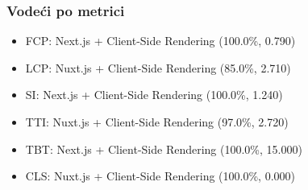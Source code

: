 \subsubsection{Vodeći po metrici}
\begin{itemize}
    \item FCP: Next.js + Client-Side Rendering (100.0\%, 0.790)
    \item LCP: Nuxt.js + Client-Side Rendering (85.0\%, 2.710)
    \item SI: Next.js + Client-Side Rendering (100.0\%, 1.240)
    \item TTI: Nuxt.js + Client-Side Rendering (97.0\%, 2.720)
    \item TBT: Next.js + Client-Side Rendering (100.0\%, 15.000)
    \item CLS: Nuxt.js + Client-Side Rendering (100.0\%, 0.000)
\end{itemize}

